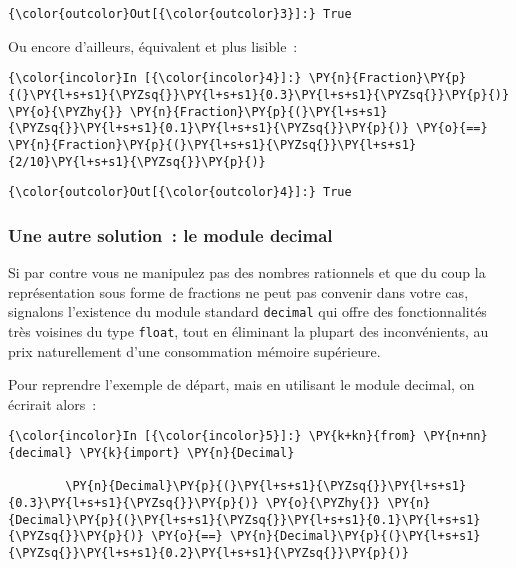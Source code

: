 \begin{Verbatim}[commandchars=\\\{\}]
{\color{outcolor}Out[{\color{outcolor}3}]:} True
\end{Verbatim}
            
    Ou encore d'ailleurs, équivalent et plus lisible~:

    \begin{Verbatim}[commandchars=\\\{\}]
{\color{incolor}In [{\color{incolor}4}]:} \PY{n}{Fraction}\PY{p}{(}\PY{l+s+s1}{\PYZsq{}}\PY{l+s+s1}{0.3}\PY{l+s+s1}{\PYZsq{}}\PY{p}{)} \PY{o}{\PYZhy{}} \PY{n}{Fraction}\PY{p}{(}\PY{l+s+s1}{\PYZsq{}}\PY{l+s+s1}{0.1}\PY{l+s+s1}{\PYZsq{}}\PY{p}{)} \PY{o}{==} \PY{n}{Fraction}\PY{p}{(}\PY{l+s+s1}{\PYZsq{}}\PY{l+s+s1}{2/10}\PY{l+s+s1}{\PYZsq{}}\PY{p}{)}
\end{Verbatim}


\begin{Verbatim}[commandchars=\\\{\}]
{\color{outcolor}Out[{\color{outcolor}4}]:} True
\end{Verbatim}
            
    \hypertarget{une-autre-solution-le-module-decimal}{%
\subsubsection{Une autre solution~: le module
decimal}\label{une-autre-solution-le-module-decimal}}

    Si par contre vous ne manipulez pas des nombres rationnels et que du
coup la représentation sous forme de fractions ne peut pas convenir dans
votre cas, signalons l'existence du module standard \texttt{decimal} qui
offre des fonctionnalités très voisines du type \texttt{float}, tout en
éliminant la plupart des inconvénients, au prix naturellement d'une
consommation mémoire supérieure.

    Pour reprendre l'exemple de départ, mais en utilisant le module decimal,
on écrirait alors~:

    \begin{Verbatim}[commandchars=\\\{\}]
{\color{incolor}In [{\color{incolor}5}]:} \PY{k+kn}{from} \PY{n+nn}{decimal} \PY{k}{import} \PY{n}{Decimal}
        
        \PY{n}{Decimal}\PY{p}{(}\PY{l+s+s1}{\PYZsq{}}\PY{l+s+s1}{0.3}\PY{l+s+s1}{\PYZsq{}}\PY{p}{)} \PY{o}{\PYZhy{}} \PY{n}{Decimal}\PY{p}{(}\PY{l+s+s1}{\PYZsq{}}\PY{l+s+s1}{0.1}\PY{l+s+s1}{\PYZsq{}}\PY{p}{)} \PY{o}{==} \PY{n}{Decimal}\PY{p}{(}\PY{l+s+s1}{\PYZsq{}}\PY{l+s+s1}{0.2}\PY{l+s+s1}{\PYZsq{}}\PY{p}{)}
\end{Verbatim}


